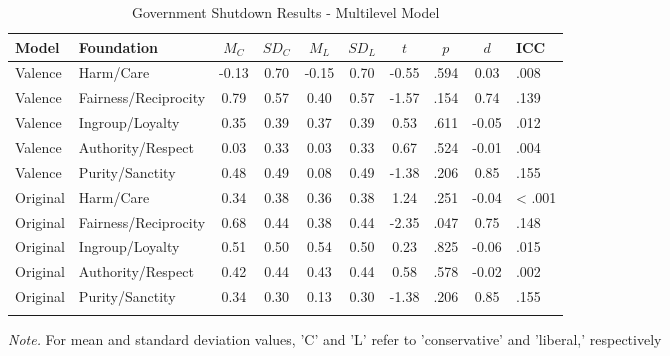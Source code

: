 \documentclass[
  man,floatsintext]{apa6}
\begin{document}
\begin{table}[h]

\begin{center}
\begin{threeparttable}

\caption{\label{tab:exp2-tablegs}Government Shutdown Results - Multilevel Model}

\footnotesize{

\begin{tabular}{llcccccccl}
\toprule
Model & Foundation & $M_C$ & $SD_C$ & $M_L$ & $SD_L$ & $t$ & $p$ & $d$ & ICC\\
\midrule
Valence & Harm/Care & -0.13 & 0.70 & -0.15 & 0.70 & -0.55 & .594 & 0.03 & .008\\
Valence & Fairness/Reciprocity & 0.79 & 0.57 & 0.40 & 0.57 & -1.57 & .154 & 0.74 & .139\\
Valence & Ingroup/Loyalty & 0.35 & 0.39 & 0.37 & 0.39 & 0.53 & .611 & -0.05 & .012\\
Valence & Authority/Respect & 0.03 & 0.33 & 0.03 & 0.33 & 0.67 & .524 & -0.01 & .004\\
Valence & Purity/Sanctity & 0.48 & 0.49 & 0.08 & 0.49 & -1.38 & .206 & 0.85 & .155\\
Original & Harm/Care & 0.34 & 0.38 & 0.36 & 0.38 & 1.24 & .251 & -0.04 & < .001\\
Original & Fairness/Reciprocity & 0.68 & 0.44 & 0.38 & 0.44 & -2.35 & .047 & 0.75 & .148\\
Original & Ingroup/Loyalty & 0.51 & 0.50 & 0.54 & 0.50 & 0.23 & .825 & -0.06 & .015\\
Original & Authority/Respect & 0.42 & 0.44 & 0.43 & 0.44 & 0.58 & .578 & -0.02 & .002\\
Original & Purity/Sanctity & 0.34 & 0.30 & 0.13 & 0.30 & -1.38 & .206 & 0.85 & .155\\
\bottomrule
\addlinespace
\end{tabular}

}

\begin{tablenotes}[para]
\normalsize{\textit{Note.} For mean and standard deviation values, 'C' and 'L' refer to 'conservative' and 'liberal,' respectively}
\end{tablenotes}

\end{threeparttable}
\end{center}

\end{table}
\end{document}
